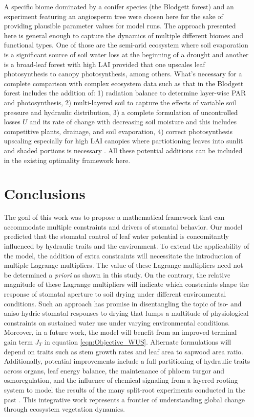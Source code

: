 \documentclass[utf8]{frontiersSCNS} %
\begin{document}
A specific biome dominated by a conifer species (the Blodgett forest) and an experiment featuring an angiosperm tree were chosen here for the sake of providing plausible parameter values for model runs. The approach presented here is general enough to capture the dynamics of multiple different biomes and functional types. One of those are the semi-arid ecosystem where soil evaporation is a significant source of soil water loss at the beginning of a drought and another is a broad-leaf forest with high LAI provided that one upscales leaf photosynthesis to canopy photosynthesis, among others. What's necessary for a complete comparison with complex ecosystem data such as that in the Blodgett forest includes the addition of: 1) radiation balance to determine layer-wise PAR and photosynthesis, 2) multi-layered soil to capture the effects of variable soil pressure and hydraulic distribution, 3) a complete formulation of uncontrolled losses $U$ and its rate of change with decreasing soil moisture and this includes competitive plants, drainage, and soil evaporation, 4) correct photosynthesis upscaling especially for high LAI canopies where partiotioning leaves into sunlit and shaded portions is necessary \citep{pury_1997}. All these potential additions can be included in the existing optimality framework here. 

\section{Conclusions}
The goal of this work was to propose a mathematical framework that can accommodate multiple constraints and drivers of stomatal behavior. Our model predicted that the stomatal control of leaf water potential is concomitantly influenced by hydraulic traits and the environment. To extend the applicability of the model, the addition of extra constraints will necessitate the introduction of multiple Lagrange multipliers. The value of these Lagrange multipliers need not be determined a \textit{priori} as shown in this study. On the contrary, the relative magnitude of these Lagrange multipliers will indicate which constraints shape the response of stomatal aperture to soil drying under different environmental conditions. Such an approach has promise in disentangling the topic of iso- and aniso-hydric stomatal responses to drying that lumps a multitude of physiological constraints on sustained water use under varying environmental conditions. Moreover, in a future work, the model will benefit from an improved terminal gain term $J_T$ in equation \ref{eqn:Objective_WUS}. Alternate formulations will depend on traits such as stem growth rates and leaf area to sapwood area ratio.  Additionally, potential improvements include a full partitioning of hydraulic traits across organs, leaf energy balance, the maintenance of phloem turgor and osmoregulation, and the influence of chemical signaling from a layered rooting system to model the results of the many split-root experiments conducted in the past \citep{blackman1985root, zhang1987control}. This integrative work represents a frontier of understanding global change through ecosystem vegetation dynamics.
\end{document}
